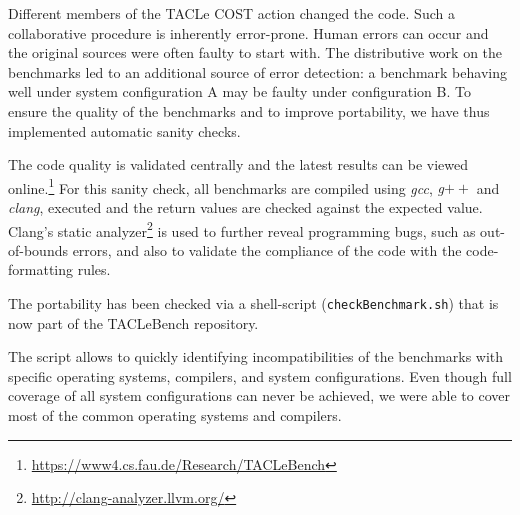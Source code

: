\documentclass[a4paper,UKenglish]{oasics-v2016}
\newcommand{\todo}[1]{{\emph{TODO: #1}}}
\newcommand{\martin}[1]{{\color{blue} Martin: #1}}
\newcommand{\code}[1]{{\small{\texttt{#1}}}}
\renewcommand{\todo}[1]{}
\renewcommand{\martin}[1]{}
\begin{document}
Different members of the TACLe COST action changed the code.
Such a collaborative procedure is inherently error-prone.
Human errors can occur and the original sources were often faulty to start with.
The distributive work on the benchmarks led to an additional source of error detection:
a benchmark behaving well under system configuration A may be faulty under configuration B.
To ensure the quality of the benchmarks and to improve portability, we have thus implemented automatic sanity checks.

The code quality
is validated centrally and the latest results can be viewed online.\footnote{\url{https://www4.cs.fau.de/Research/TACLeBench}}
For this sanity check, all benchmarks are compiled using \textit{gcc}, \textit{g$++$} and \textit{clang}, executed and the return values are checked against the expected value.
Clang's static analyzer\footnote{\url{http://clang-analyzer.llvm.org/}} is used to further reveal programming bugs, such as out-of-bounds errors, and also to validate the compliance of the code with the code-formatting rules.

The portability has been checked via a shell-script (\code{checkBenchmark.sh}) that is now part of the TACLeBench repository.
\martin{Should check again if it executes on a Mac.}
The script allows to quickly identifying incompatibilities of the benchmarks with specific operating systems, compilers, and system configurations.
Even though full coverage of all system configurations can never be achieved, we were able to cover most of the common operating systems and compilers.


\todo{Comparison compiler warning in TACLeBench v1 with v2, problem: expint was in 1.0, but is no
longer in 2.0 and powerwindow was added for 2.0}

%
\end{document}
